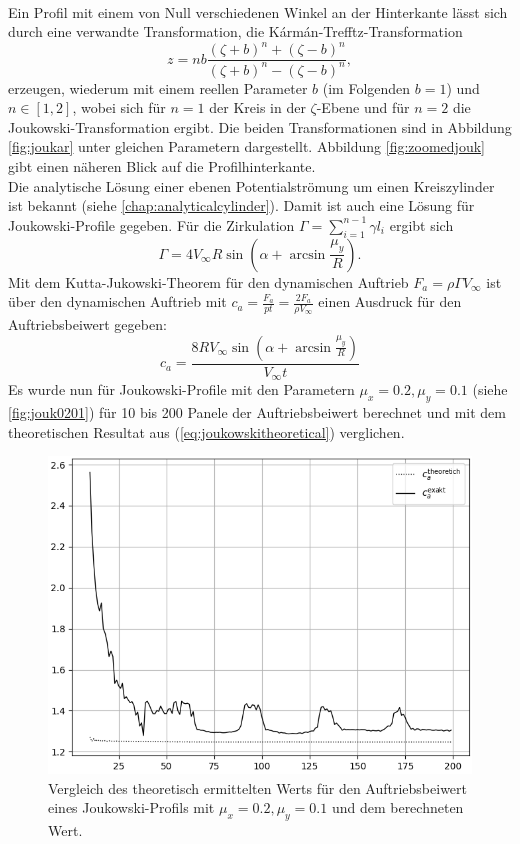 \\
Ein Profil mit einem von Null verschiedenen Winkel an der Hinterkante lässt sich durch eine verwandte Transformation, die Kármán-Trefftz-Transformation
\begin{equation}
z=nb{\frac {(\zeta +b)^{n}+(\zeta -b)^{n}}{(\zeta +b)^{n}-(\zeta -b)^{n}}},
\end{equation}
erzeugen, wiederum mit einem reellen Parameter $b$ (im Folgenden $b=1$) und $n \in [1,2]$, wobei sich für $n=1$ der Kreis in der $\zeta$-Ebene und für $n=2$ die Joukowski-Transformation ergibt. Die beiden Transformationen sind in Abbildung \ref{fig:joukar} unter gleichen Parametern dargestellt. Abbildung \ref{fig:zoomedjouk} gibt einen näheren Blick auf die Profilhinterkante. \\
Die analytische Lösung einer ebenen Potentialströmung um einen Kreiszylinder ist bekannt (siehe \ref{chap:analyticalcylinder}). Damit ist auch eine Lösung für Joukowski-Profile gegeben. Für die Zirkulation $\Gamma = \sum_{i=1}^{n-1} \gamma l_i$ ergibt sich
\begin{equation}
\Gamma = 4  V_{\infty}R \sin{\left(\alpha + \arcsin \frac{\mu_y}{R} \right)}.
\end{equation}
Mit dem Kutta-Jukowski-Theorem für den dynamischen Auftrieb $F_a = \rho \Gamma V_{\infty}$ ist über den dynamischen Auftrieb mit $c_a = \tfrac{F_a}{pt} = \tfrac{2F_a}{\rho V_{\infty}}$ einen Ausdruck für den Auftriebsbeiwert gegeben:
\begin{equation}
\label{eq:joukowskitheoretical}
c_a = \frac{8  R V_{\infty} \sin{\left(\alpha + \arcsin \frac{\mu_y}{R} \right)}}{V_{\infty}t}
\end{equation} 
Es wurde nun für Joukowski-Profile mit den Parametern $\mu_x = 0.2, \mu_y =0.1$ (siehe \ref{fig:jouk0201}) für 10 bis 200 Panele der Auftriebsbeiwert berechnet und mit dem theoretischen Resultat aus (\ref{eq:joukowskitheoretical}) verglichen. 
\begin{figure}[!ht]
\begin{center} \includegraphics[scale=0.5]{figures/joukowskitheoretical.png} \end{center}
\caption{Vergleich des theoretisch ermittelten Werts für den Auftriebsbeiwert eines Joukowski-Profils mit $\mu_x = 0.2, \mu_y =0.1$ und dem berechneten Wert.}
\label{fig:joukowskitheoretical}
\end{figure}
